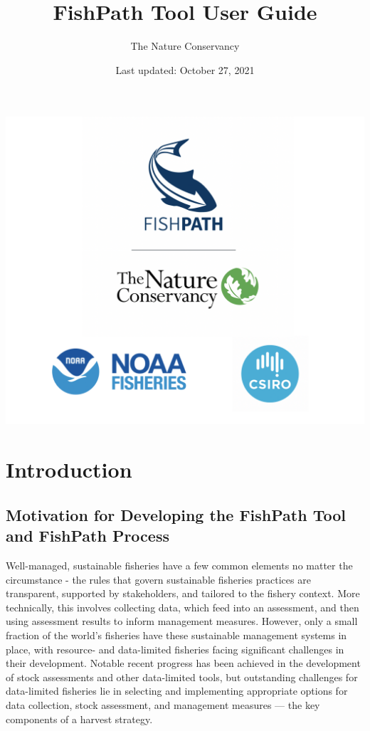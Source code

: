 \documentclass[
  11pt,
]{book}
\title{FishPath Tool User Guide}
\author{The Nature Conservancy}
\date{Last updated: October 27, 2021}
\begin{document}
\maketitle

{
\setcounter{tocdepth}{1}
\tableofcontents
}
\hypertarget{section}{%
\chapter*{}\label{section}}

\begin{center}\includegraphics[width=0.75\linewidth]{images/3-logos} \end{center}

\hypertarget{intro}{%
\chapter{Introduction}\label{intro}}

\hypertarget{motivation}{%
\section{Motivation for Developing the FishPath Tool and FishPath Process}\label{motivation}}

Well-managed, sustainable fisheries have a few common elements no matter the circumstance - the rules that govern sustainable fisheries practices are transparent, supported by stakeholders, and tailored to the fishery context. More technically, this involves collecting data, which feed into an assessment, and then using assessment results to inform management measures. However, only a small fraction of the world's fisheries have these sustainable management systems in place, with resource- and data-limited fisheries facing significant challenges in their development. Notable recent progress has been achieved in the development of stock assessments and other data-limited tools, but outstanding challenges for data-limited fisheries lie in selecting and implementing appropriate options for data collection, stock assessment, and management measures --- the key components of a harvest strategy.
\end{document}
